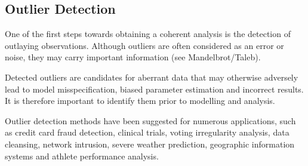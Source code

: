 \subsection{Outlier Detection}
One of the first steps towards obtaining a coherent analysis is the detection of outlaying observations. Although outliers are often considered as an error or noise, they may carry important information (see Mandelbrot/Taleb).

Detected outliers are candidates for aberrant data that may otherwise adversely lead to model misspecification, biased parameter estimation and incorrect results. It is therefore
important to identify them prior to modelling and analysis.

Outlier detection methods have been suggested for numerous applications, such as credit card fraud detection, clinical trials, voting irregularity analysis, data cleansing, network intrusion, severe weather prediction, geographic information systems and athlete performance analysis.
